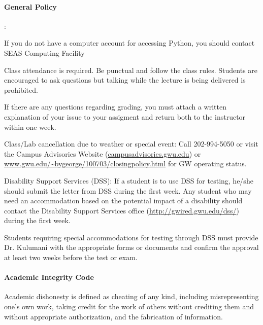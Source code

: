 \documentclass[10pt]{article}
\begin{document}
\newpage
\paragraph*{General Policy}
\begin{list}
{:}
{\setlength{\itemsep}{-3pt}}


\item If you do not have a computer account for accessing Python, you should contact SEAS Computing Facility

\item Class attendance is required. Be punctual and follow the class rules. Students are encouraged to ask questions but talking while the lecture is being delivered is prohibited.


\item If there are any questions regarding grading, you must attach a written explanation of your issue to your assigment and return both to the instructor within one week.

\item Class/Lab cancellation due to weather or special event: Call 202-994-5050 or visit the Campus Advisories Website (\url{campusadvisories.gwu.edu}) or \url{www.gwu.edu/~bygeorge/100703/closingpolicy.html} for GW operating status. 

\item Disability Support Services (DSS): If a student is to use DSS for testing, he/she should submit the letter from DSS during the first week. Any student who may need an accommodation based on the potential impact of a disability should contact the Disability Support Services office (\url{http://gwired.gwu.edu/dss/}) during the first week.

\item Students requiring special accommodations for testing through DSS must provide Dr. Kulumani with the appropriate forms or documents and confirm the approval at least two weeks before the test or exam.
\end{list}


\paragraph*{Academic Integrity Code}

Academic dishonesty is defined as cheating of any kind, including misrepresenting one's own work, taking credit for the work of others without crediting them and without appropriate authorization, and the fabrication of information. 
\end{document}
